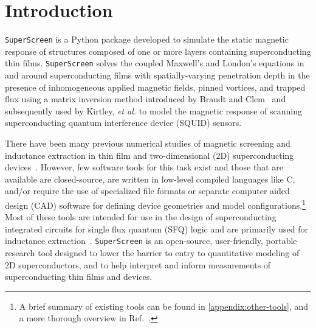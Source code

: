 \documentclass[final,3p,times,twocolumn]{elsarticle}
\newcommand{\inline}[1]{\texttt{#1}\xspace}
\newcommand{\SuperScreen}{\inline{SuperScreen}}
\begin{document}
\begin{small}
\end{small}


\section{Introduction}
\label{section:introduction}

\SuperScreen is a Python package developed to simulate the static magnetic response of structures composed of one or more layers containing superconducting thin films. \SuperScreen solves the coupled Maxwell's and London's equations in and around superconducting films with spatially-varying penetration depth in the presence of inhomogeneous applied magnetic fields, pinned vortices, and trapped flux using a matrix inversion method introduced by Brandt and Clem~\cite{Brandt2004-ew,Brandt2005-wj} and subsequently used by Kirtley, \emph{et al.} to model the magnetic response of scanning superconducting quantum interference device (SQUID) sensors.~\cite{Kirtley2016-zz, Kirtley2016-gt}

There have been many previous numerical studies of magnetic screening and inductance extraction in thin film and two-dimensional (2D) superconducting devices~\cite{Jaycox1981-zl, Ketchen1982-at, Ketchen2012-mb, Hildebrandt1995-uw, Khapaev1997-kw, Khapaev2001-xq, Khapaev2001-pw, Babaei_Brojeny2003-la, Brandt2004-ew, Brandt2005-wj, Clem2005-ye, Muller2021-ci, Jackman2016-mf}. However, few software tools for this task exist and those that are available are closed-source, are written in low-level compiled languages like C, and/or require the use of specialized file formats or separate computer aided design (CAD) software for defining device geometries and model configurations.\footnote{A brief summary of existing tools can be found in \ref{appendix:other-tools}, and a more thorough overview in Ref.~\cite{Gaj1999-ls}.} Most of these tools are intended for use in the design of superconducting integrated circuits for single flux quantum (SFQ) logic and are primarily used for inductance extraction~\cite{Gaj1999-ls}. \SuperScreen is an open-source, user-friendly, portable research tool designed to lower the barrier to entry to quantitative modeling of 2D superconductors, and to help interpret and inform measurements of superconducting thin films and devices.
\end{document}
